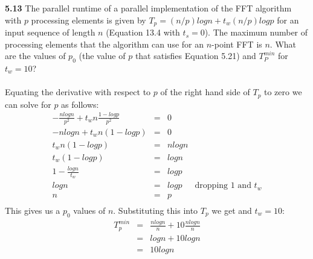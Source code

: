 \documentclass[11pt]{article}
\begin{document}
 {\bf 5.13} The parallel runtime of a parallel implementation of
 the FFT algorithm with $p$ processing elements is given by $T_p =
 (n/p) log n + t_w(n/p) log p$ for an input sequence of
 length $n$ (Equation 13.4 with $t_s = 0$). The maximum number of
 processing elements that the algorithm can use for an $n$-point
 FFT is $n$. What are the values of $p_0$ (the value of $p$
 that satisfies Equation 5.21) and $T_P^{min}$ for $t_w = 10$?\\\\
 Equating the derivative with respect to $p$ of the right hand
 side of $T_p$ to zero we can solve for $p$ as follows:
 $$ \begin{array}{rclr}
   -\frac{nlogn}{p^2}+t_wn\frac{1-logp}{p^2} & = & 0\\
   -nlogn+t_wn(1-logp) & = & 0\\
   t_wn(1-logp) & = & nlogn\\
   t_w(1-logp) & = & logn\\
   1 - \frac{logn}{t_w} & = & logp\\
   logn & = & logp & \mbox{dropping 1 and $t_w$}\\
   n & = & p\\
 \end{array}
 $$
 This gives us a $p_0$ values of $n$. Substituting this into $T_p$
 we get and $t_w = 10$:
 $$ \begin{array}{rcl}
   T_p^{min} & = & \frac{nlogn}{n} + 10\frac{nlogn}{n}\\
   & = & logn + 10logn\\
   & = & 10logn\\
 \end{array}$$
\end{document}
